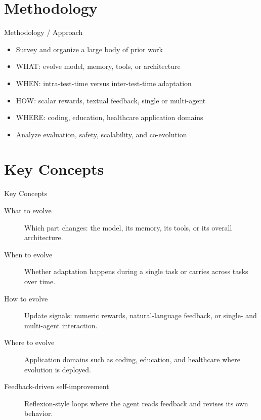 \documentclass[10pt]{beamer}
\begin{document}
\section{Methodology}
\begin{frame}[allowframebreaks]{Methodology / Approach}
\begin{itemize}
  \item Survey and organize a large body of prior work
  \item WHAT: evolve model, memory, tools, or architecture
  \item WHEN: intra-test-time versus inter-test-time adaptation
  \item HOW: scalar rewards, textual feedback, single or multi-agent
  \item WHERE: coding, education, healthcare application domains
  \item Analyze evaluation, safety, scalability, and co-evolution
\end{itemize}
\end{frame}

\section{Key Concepts}
\begin{frame}[allowframebreaks]{Key Concepts}
  \begin{description}
    \item[What to evolve] Which part changes: the model, its memory, its tools, or its overall architecture.
    \item[When to evolve] Whether adaptation happens during a single task or carries across tasks over time.
    \item[How to evolve] Update signals: numeric rewards, natural-language feedback, or single- and multi-agent interaction.
    \item[Where to evolve] Application domains such as coding, education, and healthcare where evolution is deployed.
    \item[Feedback-driven self-improvement] Reflexion-style loops where the agent reads feedback and revises its own behavior.
  \end{description}
\end{frame}
\end{document}
